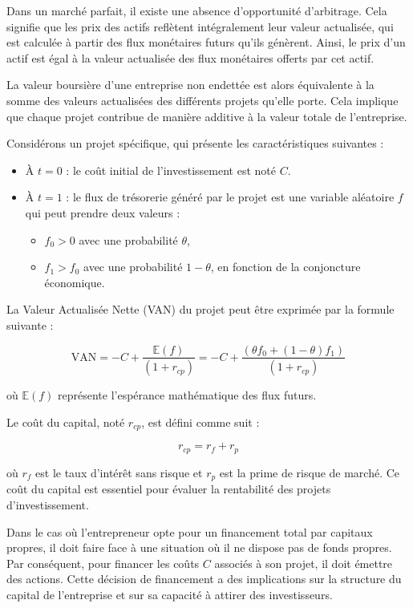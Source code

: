 \documentclass[a4paper, 12pt]{report}
\begin{document}
Dans un marché parfait, il existe une absence d'opportunité d'arbitrage. Cela signifie que les prix des actifs reflètent intégralement leur valeur actualisée, qui est calculée à partir des flux monétaires futurs qu'ils génèrent. Ainsi, le prix d'un actif est égal à la valeur actualisée des flux monétaires offerts par cet actif.

La valeur boursière d'une entreprise non endettée est alors équivalente à la somme des valeurs actualisées des différents projets qu'elle porte. Cela implique que chaque projet contribue de manière additive à la valeur totale de l'entreprise.

Considérons un projet spécifique, qui présente les caractéristiques suivantes :

\begin{itemize}
	\item À \( t = 0 \) : le coût initial de l'investissement est noté \( C \).
	\item À \( t = 1 \) : le flux de trésorerie généré par le projet est une variable aléatoire \( f \) qui peut prendre deux valeurs :
\begin{itemize}
	\item 	\( f_0 > 0 \) avec une probabilité \( \theta \),
	\item 	\( f_1 > f_0 \) avec une probabilité \( 1 - \theta \), en fonction de la conjoncture économique.
\end{itemize}
	
\end{itemize}




La Valeur Actualisée Nette (VAN) du projet peut être exprimée par la formule suivante :

\[
\text{VAN} = -C + \frac{\mathbb{E}(f)}{(1 + r_{cp})} = -C + \frac{(\theta f_0 + (1 - \theta) f_1)}{(1 + r_{cp})}
\]

où \( \mathbb{E}(f) \) représente l'espérance mathématique des flux futurs.

Le coût du capital, noté \( r_{cp} \), est défini comme suit :

\[
r_{cp} = r_f + r_p
\]

où \( r_f \) est le taux d'intérêt sans risque et \( r_p \) est la prime de risque de marché. Ce coût du capital est essentiel pour évaluer la rentabilité des projets d'investissement.

Dans le cas où l'entrepreneur opte pour un financement total par capitaux propres, il doit faire face à une situation où il ne dispose pas de fonds propres. Par conséquent, pour financer les coûts \( C \) associés à son projet, il doit émettre des actions. Cette décision de financement a des implications sur la structure du capital de l'entreprise et sur sa capacité à attirer des investisseurs.
\end{document}
